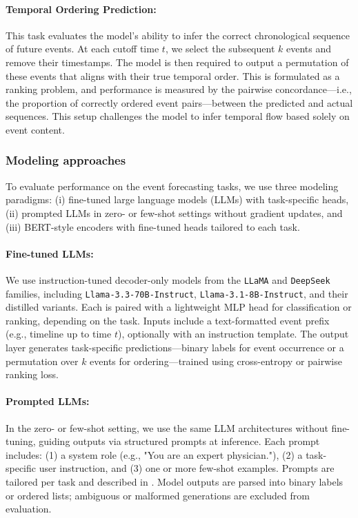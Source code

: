 \paragraph{Temporal Ordering Prediction:} This task evaluates the model’s ability to infer the correct chronological sequence of future events. At each cutoff time $t$, we select the subsequent $k$ events and remove their timestamps. The model is then required to output a permutation of these events that aligns with their true temporal order. This is formulated as a ranking problem, and performance is measured by the pairwise concordance—i.e., the proportion of correctly ordered event pairs—between the predicted and actual sequences. This setup challenges the model to infer temporal flow based solely on event content.


\subsubsection{Modeling approaches}

To evaluate performance on the event forecasting tasks, we use three modeling paradigms: (i) fine-tuned large language models (LLMs) with task-specific heads, (ii) prompted LLMs in zero- or few-shot settings without gradient updates, and (iii) BERT-style encoders with fine-tuned heads tailored to each task. 

\paragraph{Fine-tuned LLMs:} We use instruction-tuned decoder-only models from the \texttt{LLaMA} and \texttt{DeepSeek} families, including \texttt{Llama-3.3-70B-Instruct}, \texttt{Llama-3.1-8B-Instruct}, and their distilled variants. Each is paired with a lightweight MLP head for classification or ranking, depending on the task. Inputs include a text-formatted event prefix (e.g., timeline up to time $t$), optionally with an instruction template. The output layer generates task-specific predictions—binary labels for event occurrence or a permutation over $k$ events for ordering—trained using cross-entropy or pairwise ranking loss.

\paragraph{Prompted LLMs:} In the zero- or few-shot setting, we use the same LLM architectures without fine-tuning, guiding outputs via structured prompts at inference. Each prompt includes: (1) a system role (e.g., "You are an expert physician."), (2) a task-specific user instruction, and (3) one or more few-shot examples. Prompts are tailored per task and described in \cite{noroozizadeh2025forecasting}. Model outputs are parsed into binary labels or ordered lists; ambiguous or malformed generations are excluded from evaluation.

